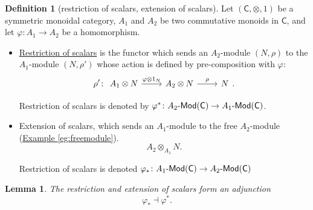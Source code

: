 \documentclass[a4paper,10pt]{scrreprt}
\newcommand{\defn}[1]{\ul{#1}}
\def\mhyp{{\hbox{-}}}
\theoremstyle{definition}
\newtheorem{definition}{Definition}[section]
\theoremstyle{plain}
\newtheorem{lemma}{Lemma}[section]
\theoremstyle{remark}
\begin{document}
\begin{definition}[restriction of scalars, extension of scalars]
  \label{def:extensionrestrictionofscalars}
  Let $(\mathsf{C}, \otimes, 1)$ be a symmetric monoidal category, $A_{1}$ and $A_{2}$ be two commutative monoids in $\mathsf{C}$, and let $\varphi\colon A_{1} \to A_{2}$ be a homomorphism.
  \begin{itemize}
    \item \defn{Restriction of scalars} is the functor which sends an $A_{2}$-module $(N, \rho)$ to the $A_{1}$-module $(N, \rho')$ whose action is defined by pre-composition with $\varphi$:
      \begin{equation*}
        \rho' \colon 
        \begin{tikzcd}
          A_{1} \otimes N
          \arrow[r, "\varphi \otimes 1_{N}"]
          & A_{2} \otimes N
          \arrow[r, "\rho"]
          & N
        \end{tikzcd}.
      \end{equation*}

      Restriction of scalars is denoted by $\varphi^{*}\colon A_{2}\mhyp\mathsf{Mod}(\mathsf{C}) \to A_{1}\mhyp\mathsf{Mod}(\mathsf{C})$.

    \item Extension of scalars, which sends an $A_{1}$-module to the free $A_{2}$-module (\hyperref[eg:freemodule]{Example \ref*{eg:freemodule}}).
      \begin{equation*}
        A_{2} \otimes_{A_{1}} N.
      \end{equation*}

      Restriction of scalars is denoted $\varphi_{*}\colon A_{1}\mhyp\mathsf{Mod}(\mathsf{C}) \to A_{2}\mhyp\mathsf{Mod}(\mathsf{C})$
  \end{itemize}
\end{definition}

\begin{lemma}
  The restriction and extension of scalars form an adjunction
  \begin{equation*}
    \varphi_{*} \dashv \varphi^{*}.
  \end{equation*}
\end{lemma}
\end{document}
